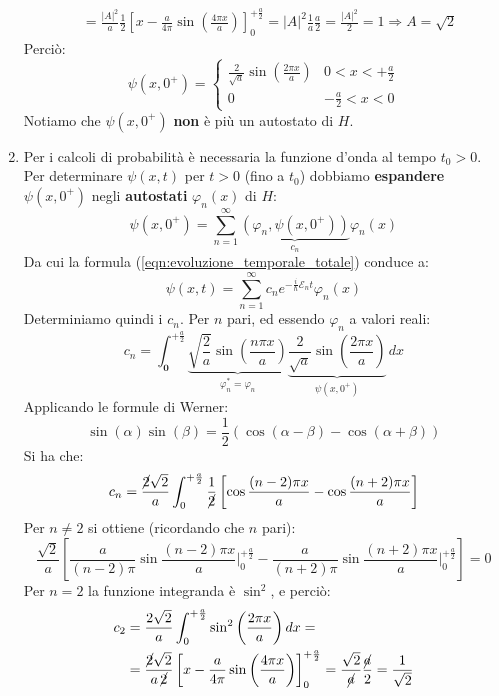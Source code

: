 \documentclass[../../FisicaTeorica.tex]{subfiles}
\begin{document}
\begin{enumerate}
\begin{align*}
&=\frac{|A|^2}{a} \frac{1}{2}\left[x-\frac{a}{4\pi}\sin\left(\frac{4\pi x}{a}\right)\right]_0^{+\frac{a}{2}} =|A|^2 \frac{1}{a} \frac{a}{2} = \frac{|A|^2}{2}=1\Rightarrow A=\sqrt{2}
\end{align*}
Perciò:
\[
\psi(x,0^+)=\begin{cases}
\frac{2}{\sqrt{a}}\sin\left(\frac{2\pi x}{a}\right) & 0<x<+\frac{a}{2}\\
0 & -\frac{a}{2}<x<0
\end{cases}
\]
Notiamo che $\psi(x,0^+)$ \textbf{non} è più un autostato di $H$.\\
\item Per i calcoli di probabilità è necessaria la funzione d'onda al tempo $t_0>0$. Per determinare $\psi(x,t)$ per $t>0$ (fino a $t_0$) dobbiamo \textbf{espandere} $\psi(x,0^+)$ negli \textbf{autostati} $\varphi_n(x)$ di $H$:
\[
\psi(x,0^+)=\sum_{n=1}^{\infty} \underbrace{(\varphi_n, \psi(x,0^+))}_{c_n}\varphi_n(x)
\]
Da cui la formula (\ref{eqn:evoluzione_temporale_totale}) conduce a:
\[
\psi(x,t)=\sum_{n=1}^\infty c_n e^{-\frac{i}{\hbar}\mathcal{E}_n t}\varphi_n(x)
\]
Determiniamo quindi i $c_n$. Per $n$ pari, ed essendo $\varphi_n$ a valori reali:
\[
c_n = \int_{\bm{0}}^{+\frac{a}{2}} \underbrace{\sqrt{\frac{2}{a}} \sin\left(\frac{n\pi x}{a}\right)}_{\varphi_n^*=\varphi_n} \underbrace{\frac{2}{\sqrt{a}}\sin\left(\frac{2\pi x}{a}\right)}_{\psi(x,0^+)}\,dx
\]
Applicando le formule di Werner:
\[
\sin(\alpha)\sin(\beta)=\frac{1}{2}\left(\cos(\alpha-\beta)-\cos(\alpha+\beta)\right)
\]
Si ha che:
\[
c_n = \frac{\cancel{2}\sqrt{2}}{a}\int_0^{+\frac{a}{2}} \frac{1}{\cancel{2}} \left[\cos \frac{(n-2)\pi x}{a}-\cos\frac{(n+2)\pi x}{a}\right]
\]
Per $n\neq 2$ si ottiene (ricordando che $n$ pari):
\[
\frac{\sqrt{2}}{a}\left[\frac{a}{(n-2)\pi}\sin\frac{(n-2)\pi x}{a}\Big|_0^{+\frac{a}{2}} - \frac{a}{(n+2)\pi}\sin\frac{(n+2)\pi x}{a}\Big|_0^{+\frac{a}{2}}\right] = 0
\]
Per $n=2$ la funzione integranda è $\sin^2$, e perciò:
\begin{align*}
c_2&=\frac{2\sqrt{2}}{a}\int_0^{+\frac{a}{2}}\sin^2\left(\frac{2\pi x}{a}\right)dx =\\
&= \frac{\cancel{2} \sqrt{2}}{a \, \cancel{2}}\left[
x-\frac{a}{4\pi}\sin\left(\frac{4\pi x}{a}\right)\right]_0^{+\frac{a}{2}} =
\frac{\sqrt{2}}{\cancel{a}}\frac{\cancel{a}}{2}=\frac{1}{\sqrt{2}}
\end{align*}


\end{enumerate}
\end{document}
